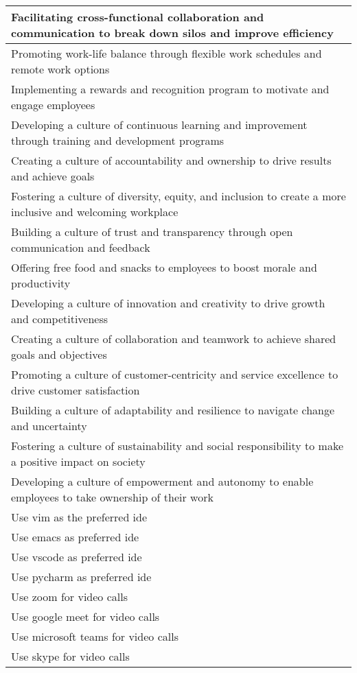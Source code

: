 \begin{xltabular}{\linewidth}{X}
 \midrule
Facilitating cross-functional collaboration and communication to break down silos and improve efficiency \\ 
 \midrule
Promoting work-life balance through flexible work schedules and remote work options \\ 
 \midrule
Implementing a rewards and recognition program to motivate and engage employees \\ 
 \midrule
Developing a culture of continuous learning and improvement through training and development programs \\ 
 \midrule
Creating a culture of accountability and ownership to drive results and achieve goals \\ 
 \midrule
Fostering a culture of diversity, equity, and inclusion to create a more inclusive and welcoming workplace \\ 
 \midrule
Building a culture of trust and transparency through open communication and feedback \\ 
 \midrule
Offering free food and snacks to employees to boost morale and productivity \\ 
 \midrule
Developing a culture of innovation and creativity to drive growth and competitiveness \\ 
 \midrule
Creating a culture of collaboration and teamwork to achieve shared goals and objectives \\ 
 \midrule
Promoting a culture of customer-centricity and service excellence to drive customer satisfaction \\ 
 \midrule
Building a culture of adaptability and resilience to navigate change and uncertainty \\ 
 \midrule
Fostering a culture of sustainability and social responsibility to make a positive impact on society \\ 
 \midrule
Developing a culture of empowerment and autonomy to enable employees to take ownership of their work \\ 
\midrule
Use vim as the preferred ide \\
Use emacs as preferred ide \\
Use vscode as preferred ide \\
Use pycharm as preferred ide \\
\midrule
Use zoom for video calls \\
Use google meet for video calls \\
Use microsoft teams for video calls \\
Use skype for video calls \\

\end{xltabular}
